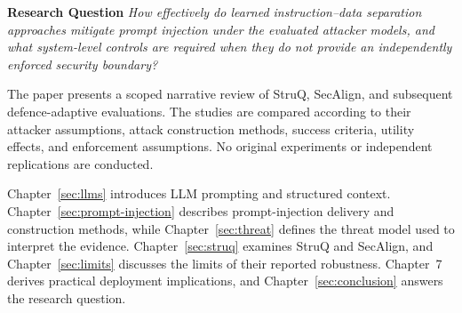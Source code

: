 \medskip
\noindent\textbf{Research Question} \quad
\textit{How effectively do learned instruction--data separation approaches
mitigate prompt injection under the evaluated attacker models, and what
system-level controls are required when they do not provide an independently
enforced security boundary?}

\medskip
The paper presents a scoped narrative review of StruQ, SecAlign, and subsequent
defence-adaptive evaluations. The studies are compared according to their
attacker assumptions, attack construction methods, success criteria, utility
effects, and enforcement assumptions. No original experiments or independent
replications are conducted.

Chapter~\ref{sec:llms} introduces LLM prompting and structured context.
Chapter~\ref{sec:prompt-injection} describes prompt-injection delivery and
construction methods, while Chapter~\ref{sec:threat} defines the threat model
used to interpret the evidence. Chapter~\ref{sec:struq} examines StruQ and
SecAlign, and Chapter~\ref{sec:limits} discusses the limits of their reported
robustness. Chapter~7 derives practical deployment implications, and
Chapter~\ref{sec:conclusion} answers the research question.